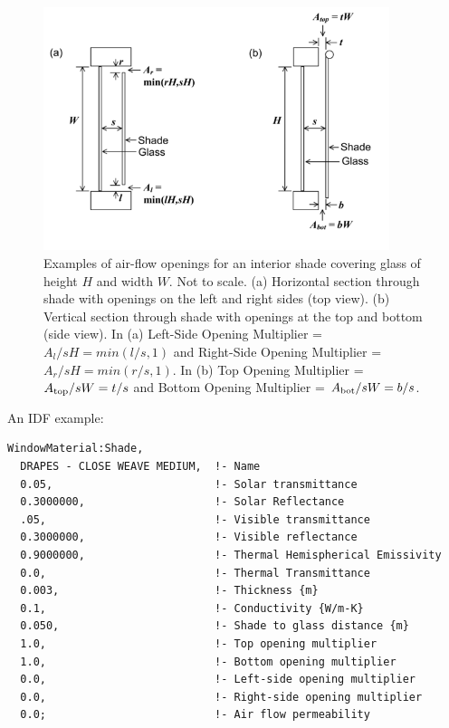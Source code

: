 \begin{figure}[hbtp] %
\centering
\includegraphics[width=0.9\textwidth, height=0.9\textheight, keepaspectratio=true]{media/image034.png}
\caption{Examples of air-flow openings for an interior shade covering glass of height \(H\) and width \(W\). Not to scale. (a) Horizontal section through shade with openings on the left and right sides (top view). (b) Vertical section through shade with openings at the top and bottom (side view). In (a) Left-Side Opening Multiplier = \(A_{l}/sH = min(l/s, 1)\) and Right-Side Opening Multiplier = \(A_{r}/sH = min(r/s, 1)\). In (b) Top Opening Multiplier = \(A_{\rm{top}}/sW = t/s\) and Bottom Opening Multiplier = \(A_{\rm{bot}}/sW = b/s\). \protect \label{fig:examples-of-air-flow-openings-for-an-interior}}
\end{figure}

An IDF example:

\begin{lstlisting}
WindowMaterial:Shade,
  DRAPES - CLOSE WEAVE MEDIUM,  !- Name
  0.05,                         !- Solar transmittance
  0.3000000,                    !- Solar Reflectance
  .05,                          !- Visible transmittance
  0.3000000,                    !- Visible reflectance
  0.9000000,                    !- Thermal Hemispherical Emissivity
  0.0,                          !- Thermal Transmittance
  0.003,                        !- Thickness {m}
  0.1,                          !- Conductivity {W/m-K}
  0.050,                        !- Shade to glass distance {m}
  1.0,                          !- Top opening multiplier
  1.0,                          !- Bottom opening multiplier
  0.0,                          !- Left-side opening multiplier
  0.0,                          !- Right-side opening multiplier
  0.0;                          !- Air flow permeability
\end{lstlisting}

